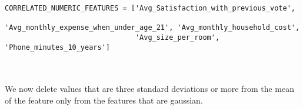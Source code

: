 \documentclass[12pt]{scrartcl}
\begin{document}
\begin{adjustbox}{max width=\linewidth}
\begin{lstlisting}
CORRELATED_NUMERIC_FEATURES = ['Avg_Satisfaction_with_previous_vote',
                               'Avg_monthly_expense_when_under_age_21', 'Avg_monthly_household_cost',
                               'Avg_size_per_room', 'Phone_minutes_10_years']
\end{lstlisting}
\end{adjustbox}\\
\\

We now delete values that are three standard deviations or more from the mean of the feature only from the features that are gaussian.
\end{document}
